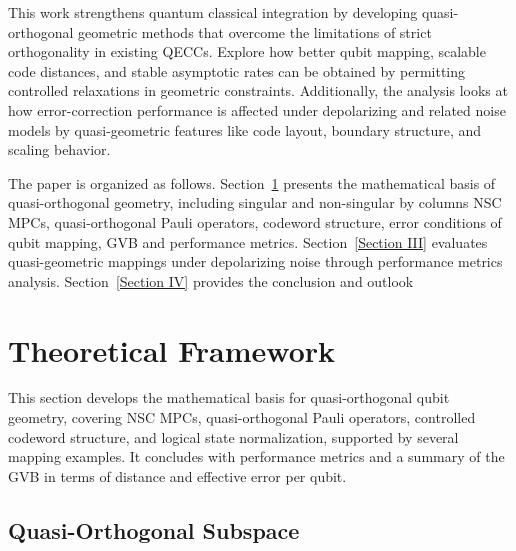 \documentclass{iopjournal}
\theoremstyle{thmstyleone}%
\theoremstyle{thmstyletwo}%
\theoremstyle{thmstylethree}%
\begin{document}
\vspace{6pt}

This work strengthens quantum classical integration by developing quasi-orthogonal geometric methods that overcome the limitations of strict orthogonality in existing QECCs.  Explore how better qubit mapping, scalable code distances, and stable asymptotic rates can be obtained by permitting controlled relaxations in geometric constraints. Additionally, the analysis looks at how error-correction performance is affected under depolarizing and related noise models by quasi-geometric features like code layout, boundary structure, and scaling behavior.

The paper is organized as follows. Section~\ref{Section II} 
presents the mathematical basis of quasi-orthogonal geometry, including singular and non-singular by columns NSC MPCs, quasi-orthogonal Pauli operators, codeword structure, error conditions of qubit mapping, GVB and  performance metrics. Section~\ref{Section III} evaluates quasi-geometric mappings under depolarizing noise through performance metrics analysis. Section~\ref{Section IV} provides the conclusion and outlook

\section{Theoretical Framework}\label{Section II}

This section develops the mathematical basis for quasi-orthogonal qubit geometry, covering NSC MPCs, quasi-orthogonal Pauli operators, controlled codeword structure, and logical state normalization, supported by several mapping examples. It concludes with performance metrics and a summary of the GVB in terms of distance and effective error per qubit.

\subsection{Quasi-Orthogonal Subspace}
\label{subsec:quasi-ortho-geom}
\end{document}
